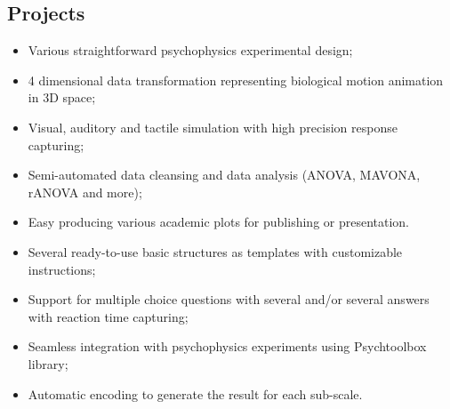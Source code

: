 \subsection{Projects}
\begin{itemize}%
\itemsep0em 
  \item Various straightforward psychophysics experimental design;
  \item 4 dimensional data transformation representing biological motion animation in 3D space;
  \item Visual, auditory and tactile simulation with high precision response capturing;
  \item Semi-automated data cleansing and data analysis (ANOVA, MAVONA, rANOVA and more);
  \item Easy producing various academic plots for publishing or presentation.
\end{itemize}
\begin{itemize}%
\itemsep0em 
  \item Several ready-to-use basic structures as templates with customizable instructions;
  \item Support for multiple choice questions with several and/or several answers with reaction time capturing;
  \item Seamless integration with psychophysics experiments using Psychtoolbox library;
  \item Automatic encoding to generate the result for each sub-scale.
\end{itemize}
